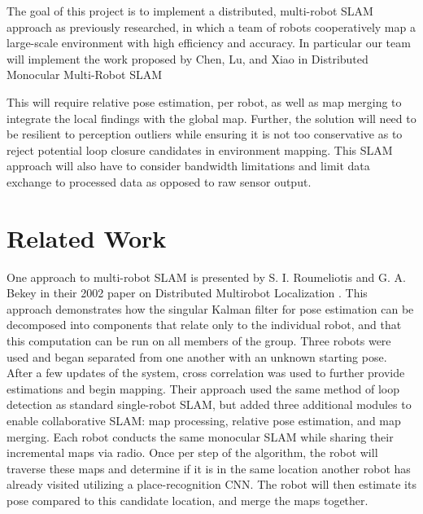 \documentclass[11pt, conference]{IEEEtran}
\begin{document}
The goal of this project is to implement a distributed, multi-robot SLAM approach as previously researched, in which a team of robots cooperatively map a large-scale environment with high efficiency and accuracy. In particular our team will implement the work proposed by Chen, Lu, and Xiao in Distributed Monocular Multi-Robot SLAM \cite{monocular}

This will require relative pose estimation, per robot, as well as map merging to integrate the local findings with the global map. Further, the solution will need to be resilient to perception outliers while ensuring it is not too conservative as to reject potential loop closure candidates in environment mapping. This SLAM approach will also have to consider bandwidth limitations and limit data exchange to processed data as opposed to raw sensor output. 

\section{Related Work}

One approach to multi-robot SLAM is presented by S. I. Roumeliotis and G. A. Bekey in their 2002 paper on Distributed Multirobot Localization \cite{1067998}. This approach demonstrates how the singular Kalman filter for pose estimation can be decomposed into components that relate only to the individual robot, and that this computation can be run on all members of the group. Three robots were used and began separated from one another with an unknown starting pose. After a few updates of the system, cross correlation was used to further provide estimations and begin mapping. Their approach used the same method of loop detection as standard single-robot SLAM, but added three additional modules to enable collaborative SLAM: map processing, relative pose estimation, and map merging. Each robot conducts the same monocular SLAM while sharing their incremental maps via radio. Once per step of the algorithm, the robot will traverse these maps and determine if it is in the same location another robot has already visited utilizing a place-recognition CNN. The robot will then estimate its pose compared to this candidate location, and merge the maps together.
\end{document}
